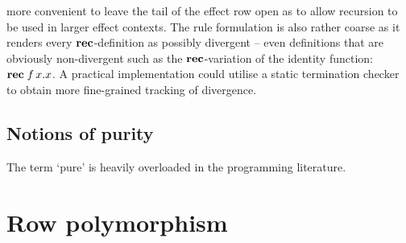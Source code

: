 \documentclass[12pt,phd,lfcs,twoside,openright,logo,leftchapter,normalheadings]{infthesis}
\theoremstyle{plain}
\theoremstyle{definition}
\begin{document}
more convenient to leave the tail of the effect row open as to allow
recursion to be used in larger effect contexts. The rule formulation
is also rather coarse as it renders every $\mathbf{rec}$-definition as
possibly divergent -- even definitions that are obviously
non-divergent such as the $\mathbf{rec}$-variation of the identity function:
$\mathbf{rec}\;f\,x.x$. A practical implementation could utilise a static
termination checker~\cite{Walther94} to obtain more fine-grained
tracking of divergence.

\subsection{Notions of purity}
\label{sec:notions-of-purity}
The term `pure' is heavily overloaded in the programming literature.
%

\section{Row polymorphism}
\label{sec:row-polymorphism}

\end{document}
